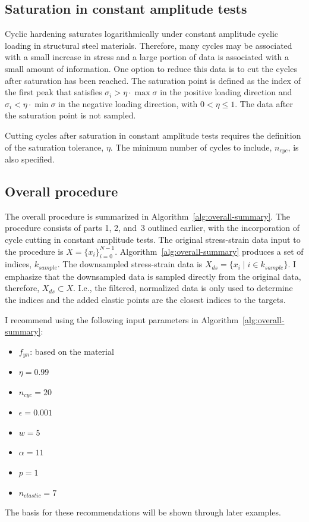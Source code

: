 \documentclass[a4paper,11pt]{article}
\begin{document}
\subsection{Saturation in constant amplitude tests}

Cyclic hardening saturates logarithmically under constant amplitude cyclic loading in structural steel materials.
Therefore, many cycles may be associated with a small increase in stress and a large portion of data is associated with a small amount of information.
One option to reduce this data is to cut the cycles after saturation has been reached.
The saturation point is defined as the index of the first peak that satisfies $\sigma_i > \eta \cdot \max \sigma$ in the positive loading direction and $\sigma_i < \eta \cdot \min \sigma$ in the negative loading direction, with $0 < \eta \leq 1$.
The data after the saturation point is not sampled.

Cutting cycles after saturation in constant amplitude tests requires the definition of the saturation tolerance, $\eta$.
The minimum number of cycles to include, $n_{cyc}$, is also specified.


\subsection{Overall procedure}

The overall procedure is summarized in Algorithm~\ref{alg:overall-summary}.
The procedure consists of parts 1, 2, and~3 outlined earlier, with the incorporation of cycle cutting in constant amplitude tests.
The original stress-strain data input to the procedure is $X = \{x_i \}_{i=0}^{N-1}$.
Algorithm~\ref{alg:overall-summary} produces a set of indices, $k_{sample}$.
The downsampled stress-strain data is $X_{ds} = \{ x_i \mid i \in k_{sample} \}$.
I emphasize that the downsampled data is sampled directly from the original data, therefore, $X_{ds} \subset X$.
I.e., the filtered, normalized data is only used to determine the indices and the added elastic points are the closest indices to the targets.

I recommend using the following input parameters in Algorithm~\ref{alg:overall-summary}:
\begin{itemize}
    \item $f_{yn}$: based on the material
    \item $\eta = 0.99$
    \item $n_{cyc} = 20$
    \item $\epsilon = 0.001$
    \item $w = 5$
    \item $\alpha = 11$
    \item $p = 1$
    \item $n_{elastic} = 7$
\end{itemize}
The basis for these recommendations will be shown through later examples.
\end{document}
